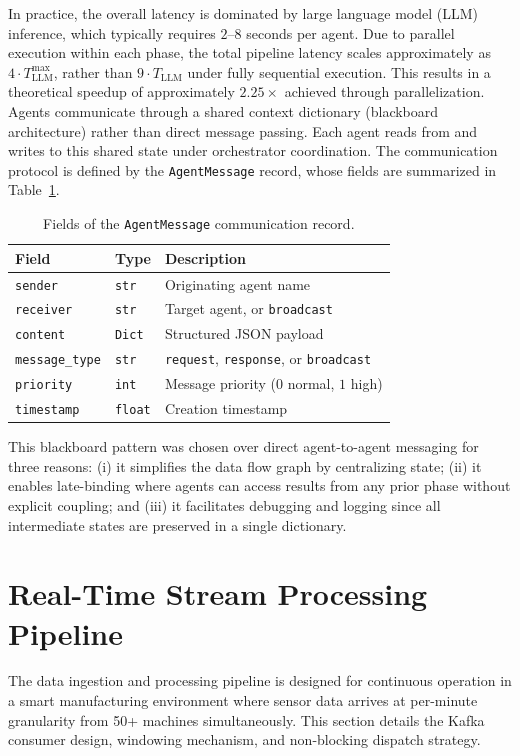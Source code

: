 In practice, the overall latency is dominated by large language model (LLM) inference, which typically requires $2$--$8$ seconds per agent. Due to parallel execution within each phase, the total pipeline latency scales approximately as $4 \cdot T_{\text{LLM}}^{\max}$, rather than $9 \cdot T_{\text{LLM}}$ under fully sequential execution. This results in a theoretical speedup of approximately $2.25\times$ achieved through parallelization.
Agents communicate through a shared context dictionary (blackboard architecture) rather than
direct message passing. Each agent reads from and writes to this shared state under orchestrator coordination. The communication protocol is defined by the \texttt{AgentMessage} record, whose fields are summarized in Table~\ref{tab:agentmessage}.
\begin{table}[!htbp]
\centering
\caption{Fields of the \texttt{AgentMessage} communication record.}
\label{tab:agentmessage}
\small
\renewcommand{\arraystretch}{1.25}
\begin{tabular}{@{}lll@{}}
\toprule
\textbf{Field} & \textbf{Type} & \textbf{Description} \\
\midrule
\texttt{sender} & \texttt{str} & Originating agent name \\
\texttt{receiver} & \texttt{str} & Target agent, or \texttt{broadcast} \\
\texttt{content} & \texttt{Dict} & Structured JSON payload \\
\texttt{message\_type} & \texttt{str} & \texttt{request}, \texttt{response}, or \texttt{broadcast} \\
\texttt{priority} & \texttt{int} & Message priority ($0$ normal, $1$ high) \\
\texttt{timestamp} & \texttt{float} & Creation timestamp \\
\bottomrule
\end{tabular}
\end{table}

This blackboard pattern was chosen over direct agent-to-agent messaging for three reasons: (i) it simplifies the data flow graph by centralizing state; (ii) it enables late-binding where agents can access results from any prior phase without explicit coupling; and (iii) it facilitates debugging and logging since all intermediate states are preserved in a single dictionary.

\section{Real-Time Stream Processing Pipeline}
The data ingestion and processing pipeline is designed for continuous operation in a smart
manufacturing environment where sensor data arrives at per-minute granularity from 50+
machines simultaneously. This section details the Kafka consumer design, windowing mechanism,
and non-blocking dispatch strategy.

